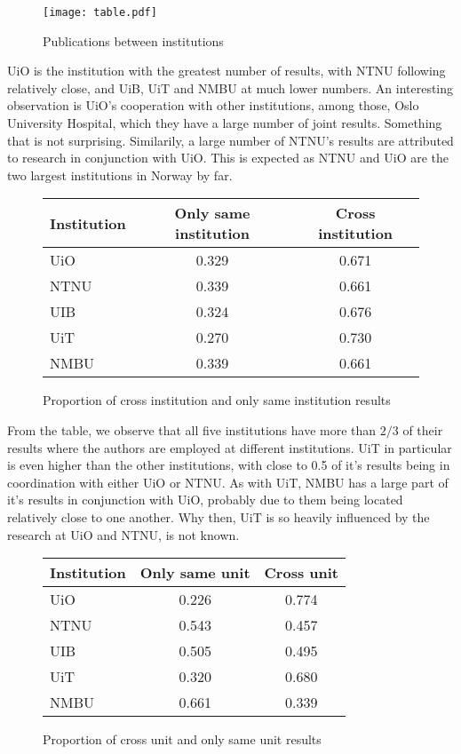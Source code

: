 \begin{figure}[h]
  \centering
  \texttt{[image: table.pdf]}
  \caption{Publications between institutions}
  \label{fig:result}
\end{figure}

UiO is the institution with the greatest number of results, with NTNU following relatively close, and UiB, UiT and NMBU at much lower numbers.
An interesting observation is UiO’s cooperation with other institutions, among those, Oslo University Hospital, which they have a large number of joint results. Something that is not surprising.
Similarily, a large number of NTNU’s results are attributed to research in conjunction with UiO. This is expected as NTNU and UiO are the two largest institutions in Norway by far.


\begin{figure}[h]
	\centering
	\begin{tabular}{| l || c | c |}
		\hline
		Institution	& Only same institution	& Cross institution	\\ \hline
		UiO		& 0.329			& 0.671			\\
		NTNU		& 0.339			& 0.661			\\
		UIB		& 0.324			& 0.676			\\
		UiT		& 0.270			& 0.730			\\
		NMBU		& 0.339			& 0.661			\\
		\hline
	\end{tabular}
	\caption{Proportion of cross institution and only same institution results}
	\label{tab:institution-proportion}
\end{figure}

From the table, we observe that all five institutions have more than $2/3$ of their results where the authors are employed at different institutions. UiT in particular is even higher than the other institutions, with close to 0.5 of it’s results being in coordination with either UiO or NTNU. As with UiT, NMBU has a large part of it’s results in conjunction with UiO, probably due to them being located relatively close to one another. Why then, UiT is so heavily influenced by the research at UiO and NTNU, is not known.

\begin{figure}[h]
	\centering
	\begin{tabular}{| l || c | c |}
		\hline
		Institution	& Only same unit	& Cross unit	\\ \hline
		UiO		& 0.226			& 0.774		\\
		NTNU		& 0.543			& 0.457		\\
		UIB		& 0.505			& 0.495		\\
		UiT		& 0.320			& 0.680		\\
		NMBU		& 0.661			& 0.339		\\
		\hline
	\end{tabular}
	\caption{Proportion of cross unit and only same unit results}
	\label{tab:unit-proportion}
\end{figure}

